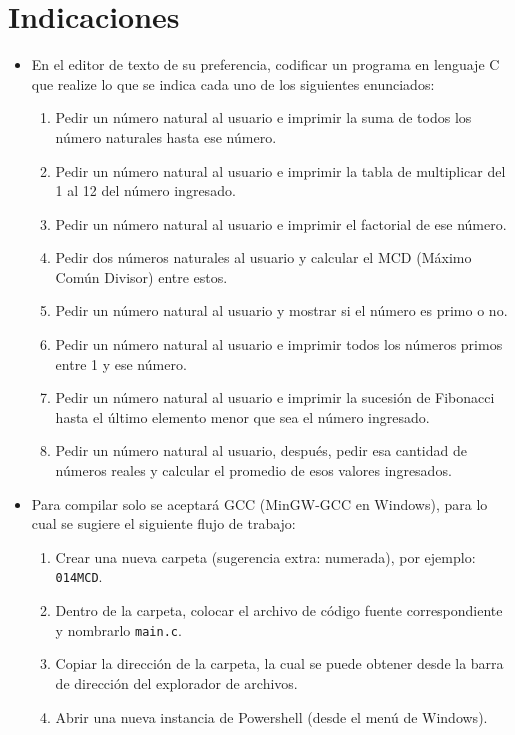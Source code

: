 \documentclass[10pt,letterpaper]{article}
\begin{document}
\section{Indicaciones}
\begin{itemize}
    \item En el editor de texto de su preferencia, codificar un programa en lenguaje C que realize lo que se indica cada uno de los siguientes enunciados:
    \begin{enumerate}[label*=\arabic*.]
        \item Pedir un número natural al usuario e imprimir la suma de todos los número naturales hasta ese número.
        \item Pedir un número natural al usuario e imprimir la tabla de multiplicar del 1 al 12 del número ingresado.
        \item Pedir un número natural al usuario e imprimir el factorial de ese número.
        \item Pedir dos números naturales al usuario y calcular el MCD (Máximo Común Divisor) entre estos.
        \item Pedir un número natural al usuario y mostrar si el número es primo o no.
        \item Pedir un número natural al usuario e imprimir todos los números primos entre 1 y ese número.
        \item Pedir un número natural al usuario e imprimir la sucesión de Fibonacci hasta el último elemento menor que sea el número ingresado.
        \item Pedir un número natural al usuario, después, pedir esa cantidad de números reales y calcular el promedio de esos valores ingresados.
    \end{enumerate}
    \pagebreak
    \item Para compilar solo se aceptará GCC (MinGW-GCC en Windows), para lo cual se sugiere el siguiente flujo de trabajo:
    \begin{enumerate}
        \item Crear una nueva carpeta (sugerencia extra: numerada), por ejemplo: \texttt{014\textunderscore MCD}.
        \item Dentro de la carpeta, colocar el archivo de código fuente correspondiente y nombrarlo \texttt{main.c}.
        \item Copiar la dirección de la carpeta, la cual se puede obtener desde la barra de dirección del explorador de archivos.
        \item Abrir una nueva instancia de Powershell (desde el menú de Windows).

\end{enumerate}
\end{itemize}
\end{document}
